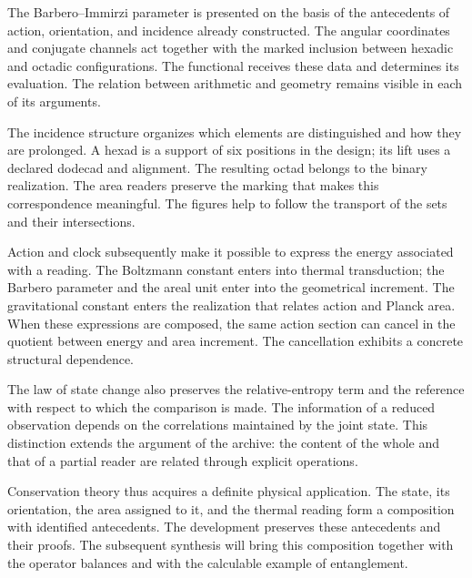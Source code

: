 
The Barbero--Immirzi parameter is presented on the basis of the antecedents
of action, orientation, and incidence already constructed. The angular
coordinates and conjugate channels act together with the marked inclusion
between hexadic and octadic configurations. The functional receives these
data and determines its evaluation. The relation between arithmetic and
geometry remains visible in each of its arguments.

The incidence structure organizes which elements are distinguished and how
they are prolonged. A hexad is a support of six positions in the design;
its lift uses a declared dodecad and alignment. The resulting octad belongs
to the binary realization. The area readers preserve the marking that
makes this correspondence meaningful. The figures help to follow the
transport of the sets and their intersections.

Action and clock subsequently make it possible to express the energy
associated with a reading. The Boltzmann constant enters into thermal
transduction; the Barbero parameter and the areal unit enter into the
geometrical increment. The gravitational constant enters the realization
that relates action and Planck area. When these expressions are composed,
the same action section can cancel in the quotient between energy and
area increment. The cancellation exhibits a concrete structural
dependence.

The law of state change also preserves the relative-entropy term and the
reference with respect to which the comparison is made. The information
of a reduced observation depends on the correlations maintained by the
joint state. This distinction extends the argument of the archive: the
content of the whole and that of a partial reader are related through
explicit operations.

Conservation theory thus acquires a definite physical application. The
state, its orientation, the area assigned to it, and the thermal reading
form a composition with identified antecedents. The development preserves
these antecedents and their proofs. The subsequent synthesis will bring
this composition together with the operator balances and with the
calculable example of entanglement.
